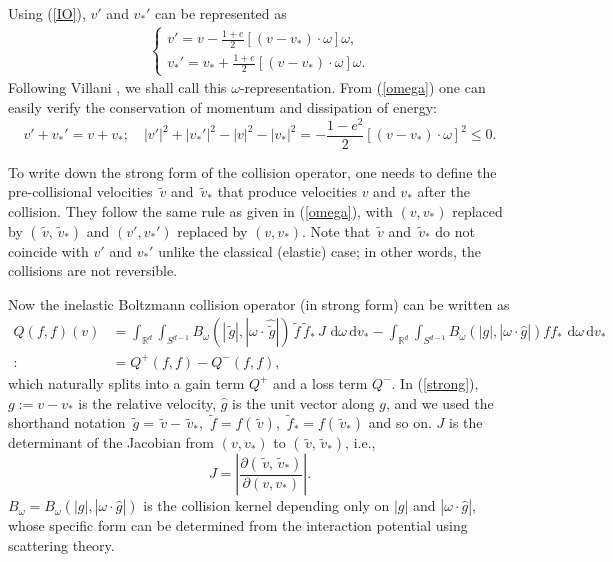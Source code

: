 \documentclass[review,times]{elsarticle}
\newcommand{\rd}{\,\mathrm{d}}
\newcommand{\tv}{\,\tilde{v}}
\newcommand{\tg}{\,\tilde{g}}
\newcommand{\tf}{\,\tilde{f}}
\begin{document}
Using (\ref{IO}), $v'$ and $v_*'$ can be represented as
\begin{align}\label{omega}
\left\{
\begin{array}{l}
\displaystyle v'=v-\frac{1+e}{2}[(v-v_*)\cdot \omega ]\omega, \\[8pt]
\displaystyle v_*'=v_*+\frac{1+e}{2}[(v-v_*)\cdot \omega]\omega.
\end{array}\right.
\end{align}
Following Villani \cite{Villani02}, we shall call this $\omega$-representation. From (\ref{omega}) one can easily verify the conservation of momentum and dissipation of energy:
\begin{equation} \label{momentum}
v'+v_*'=v+v_*; \quad |v'|^2+|v_*'|^2-|v|^2-|v_*|^2=-\frac{1-e^2}{2}[(v-v_*)\cdot \omega]^2\leq 0.
\end{equation}

To write down the strong form of the collision operator, one needs to define the pre-collisional velocities $\tv$ and $\tv_*$ that produce velocities $v$ and $v_*$ after the collision. They follow the same rule as given in (\ref{omega}), with $(v,v_*)$ replaced by $(\tv, \tv_*)$ and $(v',v_*')$ replaced by $(v,v_*)$. Note that $\tv$ and $\tv_*$ do not coincide with $v'$ and $v_*'$ unlike the classical (elastic) case; in other words, the collisions are not reversible. 

Now the inelastic Boltzmann collision operator (in strong form) can be written as
\begin{align} \label{strong}
Q(f,f)(v)&=\int_{\mathbb{R}^d}\int_{S^{d-1}}B_{\omega}(|\tg|,|\omega\cdot  \hat{\tg}|) \tf\tf_*\,J\,\rd{\omega}\rd{v_*}-\int_{\mathbb{R}^d}\int_{S^{d-1}}B_{\omega}(|g|,|\omega\cdot \hat{g}|)ff_*\,\rd{\omega}\rd{v_*}\nonumber\\
:&=Q^+(f,f)-Q^-(f,f),
\end{align}
which naturally splits into a gain term $Q^+$ and a loss term $Q^-$. In (\ref{strong}), $g:=v-v_*$ is the relative velocity, $\hat{g}$ is the unit vector along $g$, and we used the shorthand notation $\tg=\tv-\tv_*$, $\tf=f(\tv)$, $\tf_*=f(\tv_*)$ and so on. $J$ is the determinant of the Jacobian from $(v,v_*)$ to $(\tv,\tv_*)$, i.e.,
\begin{equation}
J=\left |  \frac{\partial (\tv,\tv_*)}{\partial (v,v_*)}     \right|.
\end{equation}
$B_{\omega}=B_{\omega}(|g|,|\omega\cdot \hat{g}|)$ is the collision kernel depending only on $|g|$ and $|\omega\cdot \hat{g}|$, whose specific form can be determined from the interaction potential using scattering theory. %
\end{document}
